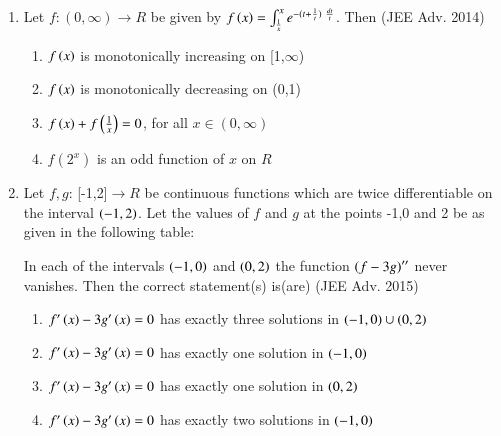\documentclass[journal]{IEEEtran}
\begin{document}
\begin{enumerate}
{        %
        
        }
    \item{
        
            Let $f: (0,\infty)\rightarrow R$ be given by $f\left(x\right) = \int_{\frac{1}{x}}^x e^{-(t + \frac{1}{t})\ \frac{dt}{t}}$. Then
             \hfill
                {(JEE Adv. 2014)}
            \begin{multicols}{2}
                \begin{enumerate}
                    \item $f\left(x\right)$ is monotonically increasing on [1,$\infty$)
                    \item $f\left(x\right)$ is monotonically decreasing on (0,1)
                    \item $f\left(x\right) + f\left(\frac{1}{x}\right) = 0$, for all $x \in (0,\infty)$
                    \item $f(2^x)$ is an odd function of $x$ on $R$ 
                \end{enumerate}
            \end{multicols}
        
        }
    \item{
        
            Let $f,g$: [-1,2]$\rightarrow R$ be continuous functions which are twice differentiable on the interval $\left(-1,2\right)$. Let the values of $f$ and $g$ at the points -1,0 and 2 be as given in the following table:
            
            In each of the intervals $\left(-1,0\right)$ and $\left(0,2\right)$ the function $\left(f-3g\right)''$ never vanishes. Then the correct statement(s) is(are)
             \hfill
                {(JEE Adv. 2015)}
            
            \begin{enumerate}
                \item $f^{\prime}\left(x\right) - 3g^{\prime}\left(x\right) = 0$ has exactly three solutions in $\left(-1,0\right)\cup\left(0,2\right)$
                \item $f^{\prime}\left(x\right) - 3g^{\prime}\left(x\right) = 0$ has exactly one solution in $\left(-1,0\right)$
                \item $f^{\prime}\left(x\right) - 3g^{\prime}\left(x\right) = 0$ has exactly one solution in $\left(0,2\right)$
                \item $f^{\prime}\left(x\right) - 3g^{\prime}\left(x\right) = 0$ has exactly two solutions in $\left(-1,0\right)$
            \end{enumerate}
        
}
\end{enumerate}
\end{document}
